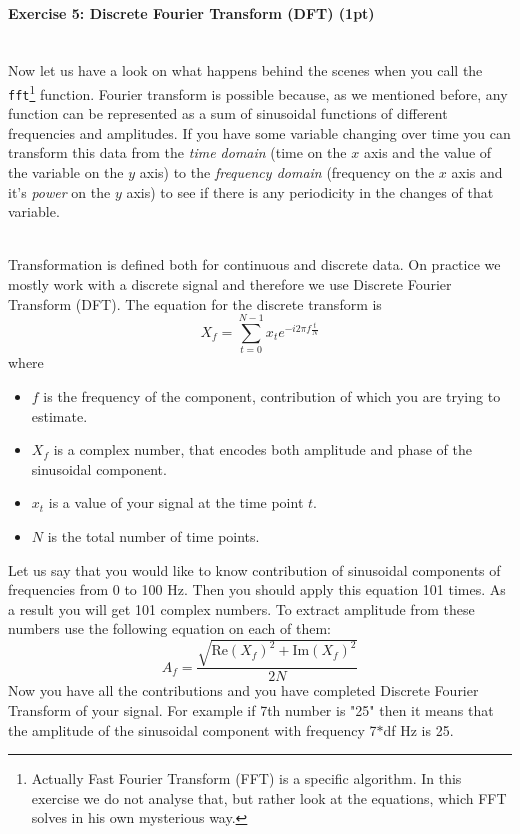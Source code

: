 \documentclass[a4paper,11pt]{article}
\newenvironment{exercise}[3]{\paragraph{Exercise #1: #2 (#3pt)}\ \\}{
\medskip}
\begin{document}
%
%
\begin{exercise}{5}{Discrete Fourier Transform (DFT)}{1}
Now let us have a look on what happens behind the scenes when you call the \texttt{fft}\footnote{Actually Fast Fourier Transform (FFT) is a specific algorithm. In this exercise we do not analyse that, but rather look at the equations, which FFT solves in his own mysterious way.} function. Fourier transform is possible because, as we mentioned before, any function can be represented as a sum of sinusoidal functions of different frequencies and amplitudes. If you have some variable changing over time you can transform this data from the \emph{time domain} (time on the $x$ axis and the value of the variable on the $y$ axis) to the \emph{frequency domain} (frequency on the $x$ axis and it's \emph{power} on the $y$ axis) to see if there is any periodicity in the changes of that variable.

\ \\
Transformation is defined both for continuous and discrete data. On practice we mostly work with a discrete signal and therefore we use Discrete Fourier Transform (DFT). The equation for the discrete transform is
$$X_f = \displaystyle\sum_{t=0}^{N-1}x_t e^{-i2\pi f\frac{t}{N}}$$
where
\begin{itemize}
\itemsep 0em
	\item $f$ is the frequency of the component, contribution of which you are trying to estimate.
	\item $X_f$ is a complex number, that encodes both amplitude and phase of the sinusoidal component.
	\item $x_t$ is a value of your signal at the time point $t$.
	\item $N$ is the total number of time points.
\end{itemize}
Let us say that you would like to know contribution of sinusoidal components of frequencies from 0 to 100 Hz. Then you should apply this equation 101 times. As a result you will get 101 complex numbers.
To extract amplitude from these numbers use the following equation on each of them:
$$A_f = \frac{\sqrt{\text{Re}(X_f)^2 + \text{Im}(X_f)^2}}{2N}$$
Now you have all the contributions and you have completed Discrete Fourier Transform of your signal. For example if 7th number is "25" then it means that the amplitude of the sinusoidal component with frequency 7$*$df Hz is 25.


\end{exercise}
\end{document}
